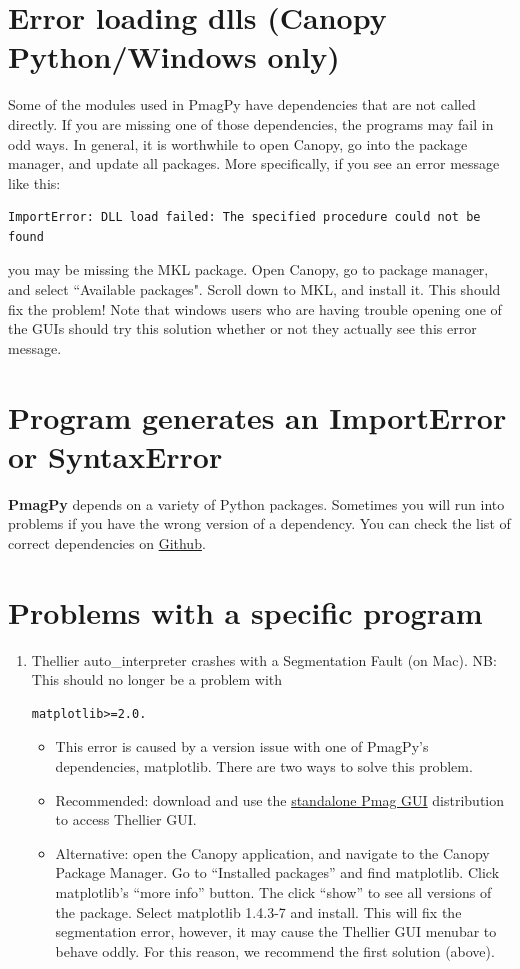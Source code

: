 \documentclass[11pt]{book}
\begin{document}
{{\begin{enumerate}
\end{enumerate}


\section{Error loading dlls (Canopy Python/Windows only)}
Some of the modules used in PmagPy have dependencies that are not called directly.  If you are missing one of those dependencies, the programs may fail in odd ways.  In general, it is worthwhile to open Canopy, go into the package manager, and update all packages.  More specifically, if you see an error message like this: \begin{verbatim}ImportError: DLL load failed: The specified procedure could not be found  \end{verbatim} you may be missing the MKL package.  Open Canopy, go to package manager, and select ``Available packages".  Scroll down to MKL, and install it.  This should fix the problem!  Note that windows users who are having trouble opening one of the GUIs should try this solution whether or not they actually see this error message.

\section{Program generates an ImportError or SyntaxError}

{\bf PmagPy} depends on a variety of Python packages.  Sometimes you will run into problems if you have the wrong version of a dependency.  You can check the list of correct dependencies on \href{https://github.com/PmagPy/PmagPy/blob/master/pmagpy_dependencies.txt}{Github}.


\section{Problems with a specific program}
\begin{enumerate}
\item Thellier auto\_interpreter crashes with a Segmentation Fault (on Mac).  NB: This should no longer be a problem with \begin{verbatim}matplotlib>=2.0.\end{verbatim}
  \begin{itemize}
  \item This error is caused by a version issue with one of PmagPy's dependencies, matplotlib.  There are two ways to solve this problem.
  \item Recommended: download and use the \href{#standalone}{standalone Pmag GUI} distribution to access Thellier GUI.
  \item Alternative: open the Canopy application, and navigate to the Canopy Package Manager.  Go to ``Installed packages'' and find matplotlib.  Click matplotlib's ``more info'' button.  The click ``show'' to see all versions of the package.  Select matplotlib 1.4.3-7 and install.  This will fix the segmentation error, however, it may cause the Thellier GUI menubar to behave oddly.  For this reason, we recommend the first solution (above).
  \end{itemize}
\end{enumerate}

}}
\end{document}
